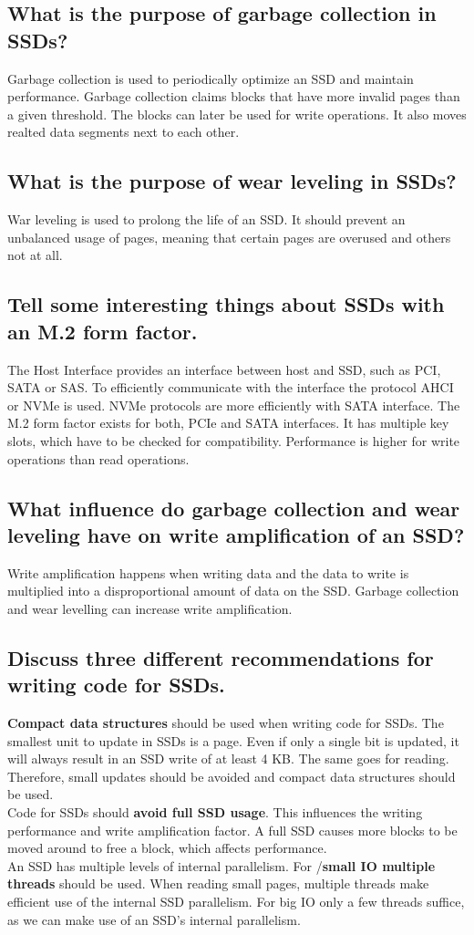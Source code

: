 \documentclass[runningheads]{llncs}
\begin{document}
\subsection{What is the purpose of garbage collection in SSDs?}
Garbage collection is used to periodically optimize an SSD and maintain performance.
Garbage collection claims blocks that have more invalid pages than a given threshold.
The blocks can later be used for write operations.
It also moves realted data segments next to each other.

\subsection{What is the purpose of wear leveling in SSDs?}
War leveling is used to prolong the life of an SSD.
It should prevent an unbalanced usage of pages, meaning that certain pages are overused and others not at all.

\subsection{Tell some interesting things about SSDs with an M.2 form factor.}
The Host Interface provides an interface between host and SSD, such as PCI, SATA or SAS.
To efficiently communicate with the interface the protocol AHCI or NVMe is used.
NVMe protocols are more efficiently with SATA interface.
The M.2 form factor exists for both, PCIe and SATA interfaces.
It has multiple key slots, which have to be checked for compatibility.
Performance is higher for write operations than read operations.

\subsection{What influence do garbage collection and wear leveling have on write amplification of an SSD?}
Write amplification happens when writing data and the data to write is multiplied into a disproportional amount of data on the SSD.
Garbage collection and wear levelling can increase write amplification.

\subsection{Discuss three different recommendations for writing code for SSDs.}
\textbf{Compact data structures} should be used when writing code for SSDs. 
The smallest unit to update in SSDs is a page. 
Even if only a single bit is updated, it will always result in an SSD write of at least 4 KB.
The same goes for reading.
Therefore, small updates should be avoided and compact data structures should be used.
\\
Code for SSDs should \textbf{avoid full SSD usage}. 
This influences the writing performance and write amplification factor.
A full SSD causes more blocks to be moved around to free a block, which affects performance.
\\
An SSD has multiple levels of internal parallelism. 
For /\textbf{small IO multiple threads} should be used. 
When reading small pages, multiple threads make efficient use of the internal SSD parallelism.
For big IO only a few threads suffice, as we can make use of an SSD's internal parallelism.
\end{document}
